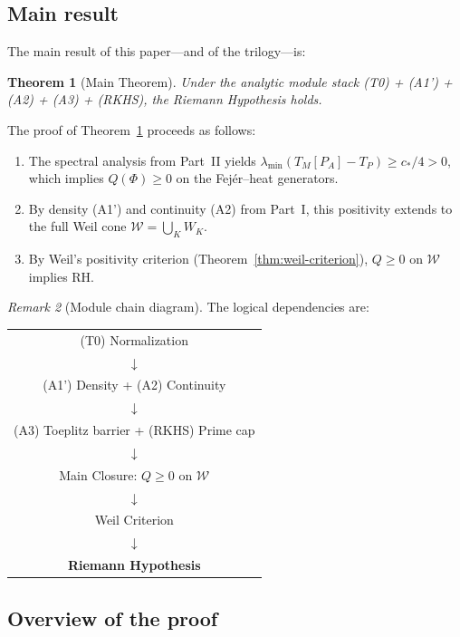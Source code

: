 \documentclass[11pt,a4paper]{article}
\newtheorem{theorem}{Theorem}[section]
\theoremstyle{definition}
\theoremstyle{remark}
\newtheorem{remark}[theorem]{Remark}
\begin{document}
\subsection{Main result}

The main result of this paper---and of the trilogy---is:

\begin{theorem}[Main Theorem]\label{thm:main}
Under the analytic module stack \textup{(T0)} + \textup{(A1')} + \textup{(A2)} + \textup{(A3)} + \textup{(RKHS)}, the Riemann Hypothesis holds.
\end{theorem}

The proof of Theorem~\ref{thm:main} proceeds as follows:
\begin{enumerate}
\item The spectral analysis from Part~II yields $\lambda_{\min}(T_M[P_A] - T_P) \geq c_*/4 > 0$, which implies $Q(\Phi) \geq 0$ on the Fej\'er--heat generators.
\item By density (A1') and continuity (A2) from Part~I, this positivity extends to the full Weil cone $\mathcal{W} = \bigcup_K W_K$.
\item By Weil's positivity criterion (Theorem~\ref{thm:weil-criterion}), $Q \geq 0$ on $\mathcal{W}$ implies RH.
\end{enumerate}

\begin{remark}[Module chain diagram]\label{rem:diagram}
The logical dependencies are:
\begin{center}
\begin{tabular}{c}
(T0) Normalization \\
$\downarrow$ \\
(A1') Density + (A2) Continuity \quad [Part~I] \\
$\downarrow$ \\
(A3) Toeplitz barrier + (RKHS) Prime cap \quad [Part~II] \\
$\downarrow$ \\
Main Closure: $Q \geq 0$ on $\mathcal{W}$ \\
$\downarrow$ \\
Weil Criterion \\
$\downarrow$ \\
\textbf{Riemann Hypothesis}
\end{tabular}
\end{center}
\end{remark}

\subsection{Overview of the proof}
\end{document}
